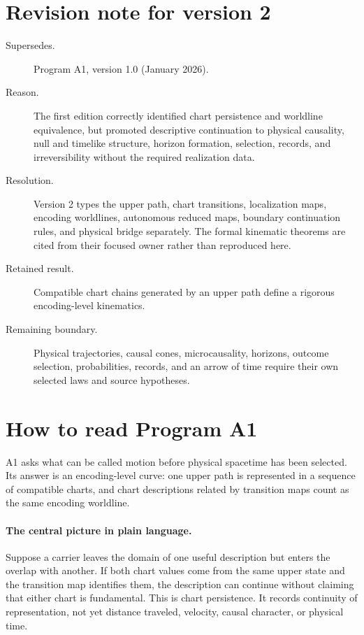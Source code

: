 \documentclass[11pt]{article}
\begin{document}
\section*{Revision note for version 2}
\begin{description}
\item[Supersedes.] Program A1, version 1.0 (January 2026).
\item[Reason.] The first edition correctly identified chart persistence and
worldline equivalence, but promoted descriptive continuation to physical
causality, null and timelike structure, horizon formation, selection, records,
and irreversibility without the required realization data.
\item[Resolution.] Version 2 types the upper path, chart transitions,
localization maps, encoding worldlines, autonomous reduced maps, boundary
continuation rules, and physical bridge separately. The formal kinematic
theorems are cited from their focused owner rather than reproduced here.
\item[Retained result.] Compatible chart chains generated by an upper path
define a rigorous encoding-level kinematics.
\item[Remaining boundary.] Physical trajectories, causal cones,
microcausality, horizons, outcome selection, probabilities, records, and an
arrow of time require their own selected laws and source hypotheses.
\end{description}

\section*{How to read Program A1}
A1 asks what can be called motion before physical spacetime has been selected.
Its answer is an encoding-level curve: one upper path is represented in a
sequence of compatible charts, and chart descriptions related by transition
maps count as the same encoding worldline.

\paragraph{The central picture in plain language.}
Suppose a carrier leaves the domain of one useful description but enters the
overlap with another.  If both chart values come from the same upper state and
the transition map identifies them, the description can continue without
claiming that either chart is fundamental.  This is chart persistence.  It
records continuity of representation, not yet distance traveled, velocity,
causal character, or physical time.
\end{document}
